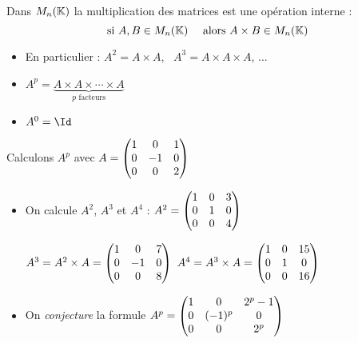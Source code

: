 \begin{frame}

Dans $M_{n}(\mathbb{K})$ la multiplication des matrices est une opération interne :
\[
\text{si } A,B \in M_n(\mathbb{K}) \quad \text{ alors } A \times B \in M_n(\mathbb{K})
\]

\pause

\begin{itemize}\setlength{\itemsep}{10pt}
  \item En particulier : $A^2 = A \times A$, \ $A^3 = A \times A \times A$, ...
\pause  
  \item $A^p = \underbrace{A \times A \times \cdots \times A}_{p \text{ facteurs}}$
\pause  
  \item $A^0=\Id$
\end{itemize}

% 
% 
% 
\end{frame}


\begin{frame}

\begin{exemple}
Calculons $A^{p}$ avec 
$A=\begin{pmatrix}
1 & 0  & 1 \cr
0 & -1 & 0\cr
0 & 0  & 2 \cr
\end{pmatrix}$

\begin{itemize}
\item\pause On calcule $A^{2}$, $A^3$ et $A^{4}$ : \pause \quad
$A^{2}= \begin{pmatrix}
1 & 0 & 3 \cr
0 & 1 & 0\cr
0 & 0 & 4 \cr
\end{pmatrix}$

\pause
$
A^{3}=A^2 \times A =
\begin{pmatrix}
1 & 0 & 7 \cr
0 & -1& 0\cr
0 & 0 & 8 \cr
\end{pmatrix}
$ \quad \pause $
A^{4}=A^3 \times A =
\begin{pmatrix}
1 & 0 & 15 \cr
0 & 1& 0\cr
0 & 0 & 16 \cr
\end{pmatrix}
$

\item\pause On \emph{conjecture} la formule
$A^{p}= \begin{pmatrix}
1 & 0       & 2^p-1 \cr
0 & (-1)^{p}& 0\cr
0 & 0       & 2^p \cr
\end{pmatrix}$

\end{itemize}
\end{exemple}

\end{frame}


